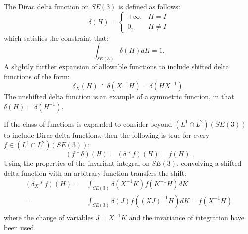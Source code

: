 \documentclass[twocolumn,10pt]{asme2ej}
\begin{document}
The Dirac delta function on $SE(3)$ is defined as follows:
\begin{equation}\label{equ2}
\delta{(H)}=
\left\{
\begin{array}{ll}
+\infty, & H=I \\
0, & H \neq I
\end{array}
\right.
\end{equation}
which satisfies the constraint that: 
\begin{equation}\label{equ3}
\int_{SE(3)}\delta{(H)}dH=1.
\end{equation}
A slightly further expansion of allowable functions to include shifted delta functions of the form:
\begin{equation}
\delta_X(H) \doteq \delta(X^{-1} H) = \delta( H X^{-1}).
\end{equation}
The unshifted delta function is an example of a symmetric function, in that $\delta(H) = \delta(H^{-1})$.

If the class of functions is expanded to consider beyond $(L^1 \cap L^2)(SE(3))$
to include Dirac delta functions, then the following is true for every $f \in (L^1 \cap L^2)(SE(3))$:
\begin{equation}
(f * \delta)(H) = (\delta * f)(H) = f(H).
\end{equation}
Using the properties of the invariant integral on $SE(3)$, convolving a shifted delta function with an arbitrary
function transfers the shift:
\begin{equation}
\begin{split}
(\delta_X * f)(H) =& \int_{SE(3)} \delta(X^{-1} K) f(K^{-1} H) dK \\
=& \int_{SE(3)} \delta(J) f((XJ)^{-1} H) dK = f(X^{-1} H) \\
\end{split}
\end{equation}
where the change of variables $J = X^{-1} K$ and the invariance of integration have been used.

\end{document}
